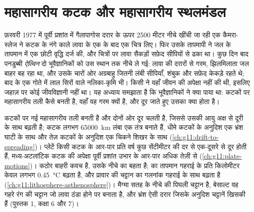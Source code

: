 \chapter{महासागरीय कटक और महासागरीय स्थलमंडल}\label{ch:g11:ocean-ridges}

फ़रवरी 1977 में पूर्वी प्रशांत में गैलापागोस दरार के ऊपर 2500 मीटर नीचे
खींची जा रही एक कैमरा-स्लेज ने कटक के नंगे काले लावा के एक के बाद एक
चित्र लिए। फिर उसके तापमापी ने जल के तापमान में एक छोटी वृद्धि दर्ज की,
और चित्रों पर लावा
सैकड़ों सफ़ेद सीपियों से ढका था। कुछ दिन बाद पनडुब्बी \emph{ऐल्विन}
दो भूवैज्ञानिकों को उस स्थान तक नीचे ले गई: लावा की दरारों से गरम, झिलमिलाता जल
बाहर बह रहा था, और उसके चारों ओर अग्रबाहु जितनी लंबी सीपियाँ,
शंबुक और सफ़ेद केकड़े रहते थे; बाद के एक गोते में लाल सिरों वाले नलिका-कृमि भी। किसी ने
वहाँ जीवन की अपेक्षा नहीं की थी, इसलिए जहाज़ पर कोई जीवविज्ञानी नहीं था। यह अध्याय समझाता है
कि भूवैज्ञानिकों ने क्या पाया था: कटकों पर महासागरीय तली कैसे बनती है,
वहाँ वह गरम क्यों है, और दूर जाते हुए उसका क्या होता है।

\begin{recall}
कटकों पर नई महासागरीय तली बनती है और दोनों ओर दूर चलती है, जिससे
उसकी आयु अक्ष से दूरी के साथ बढ़ती है; कटक लगभग
\qty{65000}{km} लंबा एक तंत्र बनाते हैं, धीमे कटकों के अनुदिश एक भ्रंश घाटी के साथ और तेज़ कटकों के अनुदिश
एक चिकने शिखर के साथ (\cref{ch:g11:drift-to-spreading})। प्लेटें किसी कटक के आर-पार
प्रति वर्ष कुछ सेंटीमीटर की दर से एक-दूसरे से दूर होती हैं, मध्य-अटलांटिक कटक की अपेक्षा
पूर्वी प्रशांत उभार के आर-पार अधिक तेज़ी से (\cref{ch:g11:plate-motions})। 
कठोर बाहरी कवच है, उसके नीचे का  बहता है;  का तापमान
गहराई के प्रति किलोमीटर केवल लगभग \qty{0.45}{\celsius} बढ़ता है,
और प्रावार की चट्टान का गलनांक गहराई के साथ बढ़ता है
(\cref{ch:g11:lithosphere-asthenosphere})। मैग्मा सतह के नीचे की पिघली चट्टान है,
बेसाल्ट वह गहरे रंग की चट्टान जो लावा ठंडा होने पर बनाता है, और भ्रंश ऐसी
दरार जिसके अनुदिश चट्टानें खिसकी हैं (पुस्तक 1, कक्षा 6 और 7)।
\end{recall}

